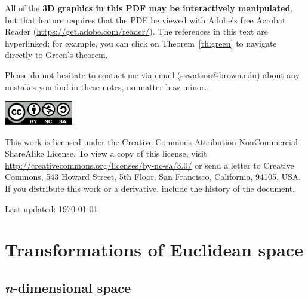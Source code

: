 \documentclass{watsonbook}
\begin{document}
\vspace{6pt}

All of the \textbf{3D graphics in this PDF may be interactively
  manipulated}, but that feature requires that the PDF be viewed with
Adobe's free Acrobat Reader
(\href{https://get.adobe.com/reader/}{\url{https://get.adobe.com/reader/}}). The
references in this text are hyperlinked; for example, you can click on
Theorem~\ref{th:green} to navigate directly to Green's theorem.

Please do not hesitate to contact me via email
(\url{sswatson@brown.edu}) about any mistakes you find in these notes,
no matter how minor.

\newpage


\null\vfill 

\includegraphics[width=3cm]{figures/cc-by-nc-sa.pdf} \\
{\small
  This work is licensed under the Creative Commons
  Attribution-NonCommercial-ShareAlike License. To view a copy of this
  license, visit 
  \url{http://creativecommons.org/licenses/by-nc-sa/3.0/} 
  or
  send a letter to Creative Commons, 543 Howard Street, 5th Floor, San
  Francisco, California, 94105, USA. If you distribute this work or a
  derivative, include the history of the document.


  Last updated: \today 
}

\vspace{5cm}

\newpage

\tableofcontents

\newpage


\chapter{Transformations of Euclidean space}

\section{\textit{n}-dimensional space} \label{sec:ndimspace} 
\end{document}
